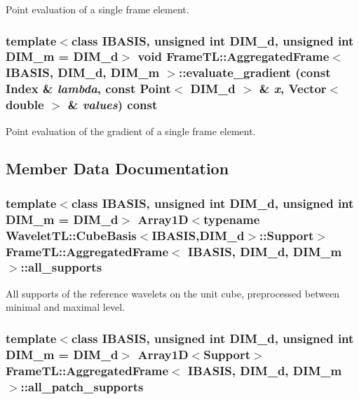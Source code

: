 Point evaluation of a single frame element. \hypertarget{classFrameTL_1_1AggregatedFrame_43c97c9d5c3931b1b61abe37514c650a}{
\subsubsection[evaluate\_\-gradient]{\setlength{\rightskip}{0pt plus 5cm}template$<$class IBASIS, unsigned int DIM\_\-d, unsigned int DIM\_\-m = DIM\_\-d$>$ void {\bf FrameTL::AggregatedFrame}$<$ IBASIS, DIM\_\-d, DIM\_\-m $>$::evaluate\_\-gradient (const {\bf Index} \& {\em lambda}, \/  const Point$<$ DIM\_\-d $>$ \& {\em x}, \/  Vector$<$ double $>$ \& {\em values}) const}}
\label{classFrameTL_1_1AggregatedFrame_43c97c9d5c3931b1b61abe37514c650a}


Point evaluation of the gradient of a single frame element. 

\subsection{Member Data Documentation}
\hypertarget{classFrameTL_1_1AggregatedFrame_79046c4fc86d939e165aa11a5c7d9f9a}{
\subsubsection[all\_\-supports]{\setlength{\rightskip}{0pt plus 5cm}template$<$class IBASIS, unsigned int DIM\_\-d, unsigned int DIM\_\-m = DIM\_\-d$>$ Array1D$<$typename WaveletTL::CubeBasis$<$IBASIS,DIM\_\-d$>$::{\bf Support}$>$ {\bf FrameTL::AggregatedFrame}$<$ IBASIS, DIM\_\-d, DIM\_\-m $>$::{\bf all\_\-supports}}}
\label{classFrameTL_1_1AggregatedFrame_79046c4fc86d939e165aa11a5c7d9f9a}


All supports of the reference wavelets on the unit cube, preprocessed between minimal and maximal level. \hypertarget{classFrameTL_1_1AggregatedFrame_f7a07f1fdbbd8a04b594d043e273ed0f}{
\subsubsection[all\_\-patch\_\-supports]{\setlength{\rightskip}{0pt plus 5cm}template$<$class IBASIS, unsigned int DIM\_\-d, unsigned int DIM\_\-m = DIM\_\-d$>$ Array1D$<${\bf Support}$>$ {\bf FrameTL::AggregatedFrame}$<$ IBASIS, DIM\_\-d, DIM\_\-m $>$::{\bf all\_\-patch\_\-supports}}}
\label{classFrameTL_1_1AggregatedFrame_f7a07f1fdbbd8a04b594d043e273ed0f}


